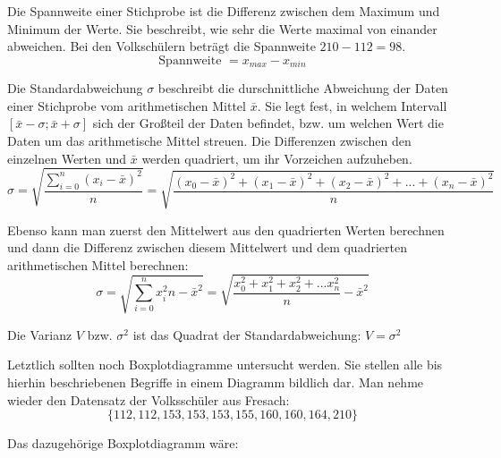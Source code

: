 
Die Spannweite einer Stichprobe ist die Differenz zwischen dem Maximum und Minimum der Werte. Sie beschreibt, wie sehr die Werte maximal von einander abweichen. Bei den Volksch\"{u}lern betr\"{a}gt die Spannweite $210 - 112 = 98$. $$\text{Spannweite } = x_{max} - x_{min}$$


Die Standardabweichung $\sigma$ beschreibt die durschnittliche Abweichung der Daten einer Stichprobe vom arithmetischen Mittel $\bar{x}$. Sie legt fest, in welchem Intervall $[\bar{x} - \sigma ; \bar{x} + \sigma]$ sich der Gro\ss{}teil der Daten befindet, bzw. um welchen Wert die Daten um das arithmetische Mittel streuen. Die Differenzen zwischen den einzelnen Werten und $\bar{x}$ werden quadriert, um ihr Vorzeichen aufzuheben. $$\sigma = \sqrt{\frac{\sum_{i=0}^{n} (x_{i} - \bar{x})^2}{n}} = \sqrt{\frac{(x_{0} - \bar{x})^2 + (x_{1} - \bar{x})^2 + (x_{2} - \bar{x})^2 + ... + (x_{n} - \bar{x})^2}{n}}$$

Ebenso kann man zuerst den Mittelwert aus den quadrierten Werten berechnen und dann die Differenz zwischen diesem Mittelwert und dem quadrierten arithmetischen Mittel berechnen: $$\sigma = \sqrt{{\sum_{i=0}^{n} x_{i}^2}{n} - \bar{x}^2} = \sqrt{\frac{x_{0}^2 + x_{1}^2 + x_{2}^2 + ... x_{n}^2}{n} - \bar{x}^2}$$

Die Varianz $V$ bzw. $\sigma^2$ ist das Quadrat der Standardabweichung: $V = \sigma^2$

\pagebreak


Letztlich sollten noch Boxplotdiagramme untersucht werden. Sie stellen alle bis hierhin beschriebenen Begriffe in einem Diagramm bildlich dar. Man nehme wieder den Datensatz der Volkssch\"{u}ler aus Fresach: $$\{ 112, 112, 153, 153, 153, 155, 160, 160, 164, 210\}$$

Das dazugeh\"{o}rige Boxplotdiagramm w\"{a}re:

\extrapar

\begin{figure}[h!]
\end{figure}

